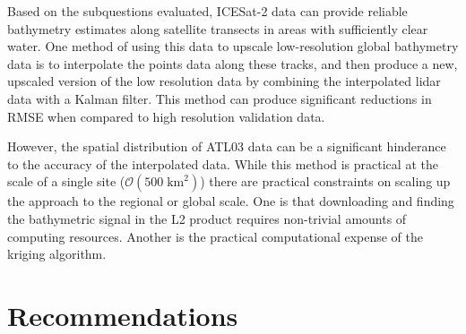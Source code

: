 Based on the subquestions evaluated, ICESat-2 data can provide reliable bathymetry estimates along satellite transects in areas with sufficiently clear water. One method of using this data to upscale low-resolution global bathymetry data is to interpolate the points data along these tracks, and then produce a new, upscaled version of the low resolution data by combining the interpolated lidar data with a Kalman filter. This method can produce significant reductions in RMSE when compared to high resolution validation data. 

However, the spatial distribution of ATL03 data can be a significant hinderance to the accuracy of the interpolated data. While this method is practical at the scale of a single site ($\mathcal{O}(500\;\text{km}^2)$) there are practical constraints on scaling up the approach to the regional or global scale. One is that downloading and finding the bathymetric signal in the L2 product requires non-trivial amounts of computing resources. Another is the practical computational expense of the kriging algorithm.




\section{Recommendations}

